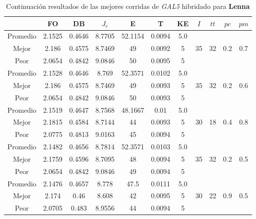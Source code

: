 \begin{table}[h!]
    \footnotesize
    \begin{center}
        \begin{tabular}{|c|c|c|c|c|c|c|c|c|c|c|}
        \hline
             & {\bf FO} & {\bf DB} & $J_e$ & {\bf E} & {\bf T} & {\bf KE} & $I$ & $tt$ & $pc$ & $pm$ \\
        \hline
        \hline
            Promedio  & 2.1525 & 0.4646 & 8.7705 & 52.1154 & 0.0094 & 5.0 &  &  &  & \\
            \cline{1-7}
            Mejor & 2.186 & 0.4575  & 8.7469 & 49 & 0.0092 & 5 & 35 & 32 & 0.2 & 0.7\\
            \cline{1-7}
            Peor & 2.0654 & 0.4842  & 9.0846 & 50 & 0.0095 & 5 &  &  &  & \\
        \hline
        \hline
            Promedio  & 2.1528 & 0.4646 & 8.769 & 52.3571 & 0.0102 & 5.0 &  &  &  & \\
            \cline{1-7}
            Mejor & 2.186 & 0.4575  & 8.7469 & 49 & 0.0093 & 5 & 35 & 32 & 0.2 & 0.6\\
            \cline{1-7}
            Peor & 2.0654 & 0.4842  & 9.0846 & 50 & 0.0093 & 5 &  &  &  & \\
        \hline
        \hline
            Promedio  & 2.1519 & 0.4647 & 8.7568 & 48.1667 & 0.01 & 5.0 &  &  &  & \\
            \cline{1-7}
            Mejor & 2.1815 & 0.4584  & 8.7144 & 44 & 0.0093 & 5 & 30 & 18 & 0.4 & 0.8\\
            \cline{1-7}
            Peor & 2.0775 & 0.4813  & 9.0163 & 45 & 0.0094 & 5 &  &  &  & \\
        \hline
        \hline
            Promedio  & 2.1482 & 0.4656 & 8.7814 & 52.3571 & 0.0103 & 5.0 &  &  &  & \\
            \cline{1-7}
            Mejor & 2.1759 & 0.4596  & 8.7095 & 48 & 0.0094 & 5 & 35 & 32 & 0.2 & 0.5\\
            \cline{1-7}
            Peor & 2.0654 & 0.4842  & 9.0846 & 49 & 0.0094 & 5 &  &  &  & \\
        \hline
        \hline
            Promedio  & 2.1476 & 0.4657 & 8.778 & 47.5 & 0.0111 & 5.0 &  &  &  & \\
            \cline{1-7}
            Mejor & 2.174 & 0.46  & 8.608 & 42 & 0.0095 & 5 & 30 & 22 & 0.9 & 0.5\\
            \cline{1-7}
            Peor & 2.0705 & 0.483  & 8.9556 & 44 & 0.0094 & 5 &  &  &  & \\
        \hline
        \end{tabular}
        \caption{Continuaci\'on resultados de las mejores corridas de \emph{GAL5} hibridado para {\bf Lenna}}
        \label{tb:tablecGAL5}
    \end{center}
\end{table}
